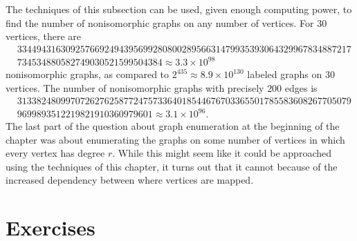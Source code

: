 The techniques of this subsection can be used, given enough computing
power, to find the number of nonisomorphic graphs on any number of
vertices. For $30$ vertices, there are 
\begin{align*}
  &334494316309257669249439569928080028956631479935393064329967834887217\\
  &734534880582749030521599504384\approx 3.3\times 10^{98}
\end{align*}
nonisomorphic graphs, as compared to $2^{435}\approx 8.9\times
10^{130}$ labeled graphs on $30$ vertices. The number of nonisomorphic
graphs with precisely $200$ edges is
\begin{align*}
  &313382480997072627625877247573364018544676703365501785583608267705079\\
  &9699893512219821910360979601\approx 3.1\times 10^{96}.
\end{align*}
The last part of the question about graph enumeration at the beginning
of the chapter was about enumerating the graphs on some number of
vertices in which every vertex has degree $r$. While this might seem
like it could be approached using the techniques of this chapter, it
turns out that it cannot because of the increased dependency between
where vertices are mapped.

\section{Exercises}\label{s:polya:exercises}

